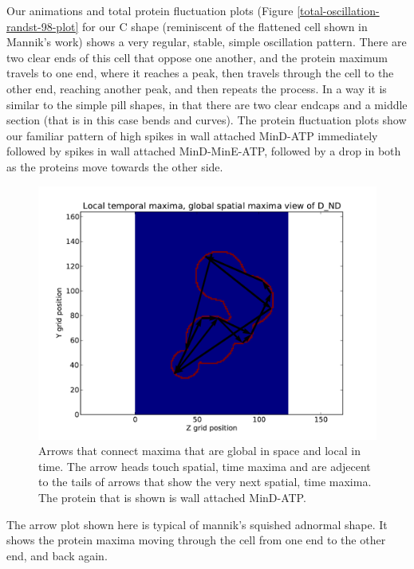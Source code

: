 \documentclass[letterpaper,twocolumn,amsmath,amssymb,pre]{revtex4-1}
\begin{document}
Our animations and total protein fluctuation plots (Figure
\ref{total-oscillation-randst-98-plot} for our C shape (reminiscent of
the flattened cell shown in Mannik's work) shows a very regular,
stable, simple oscillation pattern.  There are two clear ends of this
cell that oppose one another, and the protein maximum travels to one
end, where it reaches a peak, then travels through the cell to the
other end, reaching another peak, and then repeats the process.  In a
way it is similar to the simple pill shapes, in that there are two
clear endcaps and a middle section (that is in this case bends and
curves).  The protein fluctuation plots show our familiar pattern of
high spikes in wall attached MinD-ATP immediately followed by spikes
in wall attached MinD-MinE-ATP, followed by a drop in both as the
proteins move towards the other side.

\begin{figure}
  \includegraphics[width=\columnwidth]{../data/shape-randst/plots/arrow-plot-D_ND-randst-25-600-800-9800-1500}
  \caption{Arrows that connect maxima that are global in space and
    local in time. The arrow heads touch spatial, time maxima and are
    adjecent to the tails of arrows that show the very next spatial,
    time maxima. The protein that is shown is wall attached MinD-ATP.}
  \label{arrow-plot-randst-98-plot}
\end{figure}

The arrow plot shown here is typical of mannik's squished adnormal
shape.  It shows the protein maxima moving through the cell from one
end to the other end, and back again.
\end{document}
